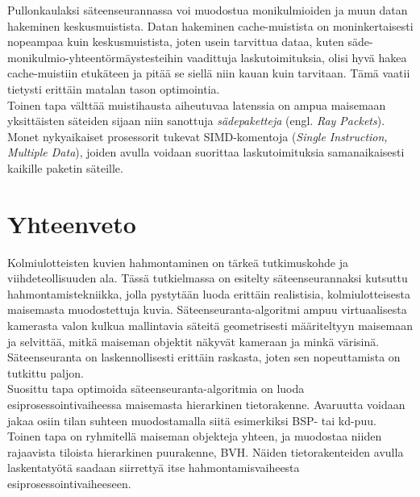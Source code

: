 ﻿\documentclass[a4paper, 12pt, titlepage]{article}
\begin{document}
Pullonkaulaksi säteenseurannassa voi muodostua monikulmioiden ja muun datan hakeminen keskusmuistista. Datan hakeminen cache-muistista on moninkertaisesti nopeampaa kuin keskusmuistista, joten usein tarvittua dataa, kuten säde-monikulmio-yhteentörmäystesteihin vaadittuja laskutoimituksia, olisi hyvä hakea cache-muistiin etukäteen ja pitää se siellä niin kauan kuin tarvitaan. Tämä vaatii tietysti erittäin matalan tason optimointia. \citep[.]{wald01}\\

Toinen tapa välttää muistihausta aiheutuvaa latenssia on ampua maisemaan yksittäisten säteiden sijaan niin sanottuja \emph{sädepaketteja} (engl. \emph{Ray Packets}). Monet nykyaikaiset prosessorit tukevat SIMD-komentoja (\emph{Single Instruction, Multiple Data}), joiden avulla voidaan suorittaa laskutoimituksia samanaikaisesti kaikille paketin säteille. \citep[.]{wald01}\\

 



\newpage
\section{Yhteenveto}

Kolmiulotteisten kuvien hahmontaminen on tärkeä tutkimuskohde ja viihdeteollisuuden ala. Tässä tutkielmassa on esitelty säteenseurannaksi kutsuttu hahmontamistekniikka, jolla pystytään luoda erittäin realistisia, kolmiulotteisesta maisemasta muodostettuja kuvia. Säteenseuranta-algoritmi ampuu virtuaalisesta kamerasta valon kulkua mallintavia säteitä geometrisesti määriteltyyn maisemaan ja selvittää, mitkä maiseman objektit näkyvät kameraan ja minkä värisinä. Säteenseuranta on laskennollisesti erittäin raskasta, joten sen nopeuttamista on tutkittu paljon.    \\

Suosittu tapa optimoida säteenseuranta-algoritmia on luoda esiprosessointivaiheessa maisemasta hierarkinen tietorakenne. Avaruutta voidaan jakaa osiin tilan suhteen muodostamalla siitä esimerkiksi BSP- tai kd-puu. Toinen tapa on ryhmitellä maiseman objekteja yhteen, ja muodostaa niiden rajaavista tiloista hierarkinen puurakenne, BVH. Näiden tietorakenteiden avulla laskentatyötä saadaan siirrettyä itse hahmontamisvaiheesta esiprosessointivaiheeseen.\\
\end{document}
